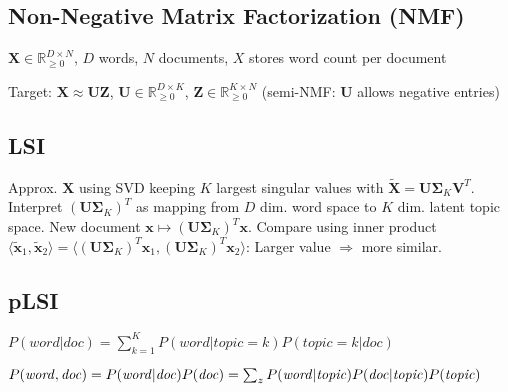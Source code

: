 \documentclass[a4paper, 11pt, landscape]{article}
\begin{document}
\begin{multicols*}{3}
\section{Non-Negative Matrix Factorization (NMF)}
\begin{inparaitem}[\color{red}\textbullet]
	\item $\mathbf{X} \in \mathbb{R}^{D \times N}_{\geq 0}$, $D$ words, $N$ documents, $X$ stores word count per document
	\item Target: $\mathbf{X} \approx \mathbf{UZ}$, $\mathbf{U} \in \mathbb{R}^{D \times K}_{\geq 0}$, $\mathbf{Z} \in \mathbb{R}^{K \times N}_{\geq 0}$ (semi-NMF: $\mathbf{U}$ allows negative entries)
\end{inparaitem}

\subsection{LSI}
Approx. $\mathbf{X}$ using SVD keeping $K$ largest singular values with $\tilde{\mathbf{X}} = \mathbf{U} \boldsymbol{\Sigma}_K \mathbf{V}^T$. Interpret $(\mathbf{U} \boldsymbol{\Sigma}_K)^T$ as mapping from $D$ dim. word space to $K$ dim. latent topic space. New document $\mathbf{x} \mapsto (\mathbf{U} \boldsymbol{\Sigma}_K)^T \mathbf{x}$. Compare using inner product $\langle \tilde{\mathbf{x}}_1, \tilde{\mathbf{x}}_2 \rangle = \langle (\mathbf{U} \boldsymbol{\Sigma}_K)^T \mathbf{x}_1, (\mathbf{U} \boldsymbol{\Sigma}_K)^T \mathbf{x}_2 \rangle$: Larger value $\Rightarrow$ more similar.

\subsection{pLSI}
\begin{compactitem}
	\item $P(\mathit{word} | \mathit{doc}) = \sum_{k=1}^K P(\mathit{word} | \mathit{topic} = k) P(\mathit{topic} = k | \mathit{doc})$
	\item $P(\mathit{word}, \mathit{doc}) = P(\mathit{word} | \mathit{doc}) P(\mathit{doc}) \break= \sum_z P(\mathit{word} | \mathit{topic}) P(\mathit{doc} | \mathit{topic}) P(\mathit{topic})$
\end{compactitem}


\end{multicols*}
\end{document}
